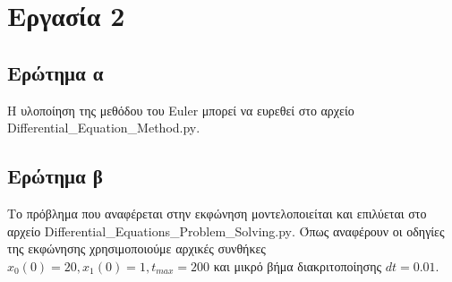\documentclass{article}
\begin{document}
\section{Εργασία 2}

\vspace*{\fill}

\subsection{Ερώτημα α}
Η υλοποίηση της μεθόδου του \foreignlanguage{english}{Euler} μπορεί να ευρεθεί στο αρχείο \foreignlanguage{english}{Differential\_Equation\_Method.py}.
\vspace*{\fill}
\subsection{Ερώτημα β}
Το πρόβλημα που αναφέρεται στην εκφώνηση μοντελοποιείται και επιλύεται στο αρχείο \foreignlanguage{english}{Differential\_Equations\_Problem\_Solving.py}. Όπως αναφέρουν οι οδηγίες της εκφώνησης χρησιμοποιούμε αρχικές συνθήκες $ x_0(0) = 20, x_1(0) = 1, t_{max} = 200 $ και μικρό βήμα διακριτοποίησης $ dt = 0.01 $.
\vspace*{\fill}
\end{document}
